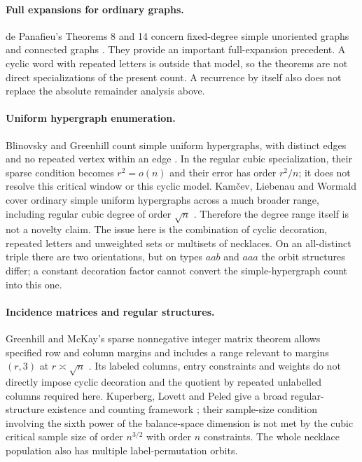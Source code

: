 \documentclass[11pt]{article}
\theoremstyle{definition}\newtheorem{definition}[theorem]{Definition}
\theoremstyle{remark}\newtheorem{remark}[theorem]{Remark}
\numberwithin{equation}{section}
\begin{document}
\paragraph{Full expansions for ordinary graphs.}
de Panafieu's Theorems 8 and 14 concern fixed-degree simple unoriented graphs and connected graphs \cite{depanafieu}. They provide an important full-expansion precedent. A cyclic word with repeated letters is outside that model, so the theorems are not direct specializations of the present count. A recurrence by itself also does not replace the absolute remainder analysis above.

\paragraph{Uniform hypergraph enumeration.}
Blinovsky and Greenhill count simple uniform hypergraphs, with distinct edges and no repeated vertex within an edge \cite{blinovsky}. In the regular cubic specialization, their sparse condition becomes $r^2=o(n)$ and their error has order $r^2/n$; it does not resolve this critical window or this cyclic model. Kam\v{c}ev, Liebenau and Wormald cover ordinary simple uniform hypergraphs across a much broader range, including regular cubic degree of order $\sqrt n$ \cite{kamcev}. Therefore the degree range itself is not a novelty claim. The issue here is the combination of cyclic decoration, repeated letters and unweighted sets or multisets of necklaces. On an all-distinct triple there are two orientations, but on types $aab$ and $aaa$ the orbit structures differ; a constant decoration factor cannot convert the simple-hypergraph count into this one.

\paragraph{Incidence matrices and regular structures.}
Greenhill and McKay's sparse nonnegative integer matrix theorem allows specified row and column margins and includes a range relevant to margins $(r,3)$ at $r\asymp\sqrt n$ \cite{greenhillmckay}. Its labeled columns, entry constraints and weights do not directly impose cyclic decoration and the quotient by repeated unlabelled columns required here. Kuperberg, Lovett and Peled give a broad regular-structure existence and counting framework \cite{klp}; their sample-size condition involving the sixth power of the balance-space dimension is not met by the cubic critical sample size of order $n^{3/2}$ with order $n$ constraints. The whole necklace population also has multiple label-permutation orbits.
\end{document}
